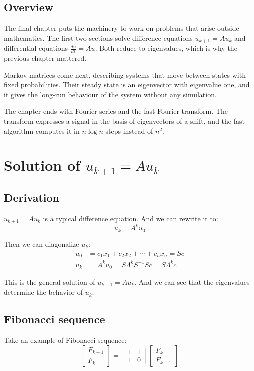 \documentclass[10pt,a4paper,oneside,numbers=noenddot]{scrbook}
\theoremstyle{ctplain}
\theoremstyle{ctresult}
\begin{document}
\subsection*{Overview}

The final chapter puts the machinery to work on problems that arise outside mathematics.
The first two sections solve difference equations $u_{k+1} = A u_k$ and differential
equations $\frac{du}{dt} = A u$. Both reduce to eigenvalues, which is why the previous
chapter mattered.

Markov matrices come next, describing systems that move between states with fixed
probabilities. Their steady state is an eigenvector with eigenvalue one, and it gives the
long-run behaviour of the system without any simulation.

The chapter ends with Fourier series and the fast Fourier transform. The transform
expresses a signal in the basis of eigenvectors of a shift, and the fast algorithm computes
it in $n \log n$ steps instead of $n^2$.


\section{Solution of $u_{k+1} = Au_k$}
\subsection{Derivation}

$u_{k+1} = Au_k$ is a typical difference equation. And we can rewrite it to:
\[
  u_k = A^k u_0
\]

Then we can diagonalize $u_k$:
\begin{align*}
  u_0 &= c_1 x_1 + c_2 x_2 + \cdots + c_n x_n = Sc \\
  u_k &= A^k u_0 = S\Lambda^k S^{-1}Sc = S\Lambda^k c
\end{align*}

This is the general solution of $u_{k+1} = Au_k$. And we can see that the eigenvalues
determine the behavior of $u_k$.

\subsection{Fibonacci sequence}

Take an example of Fibonacci sequence:
\[
  \begin{bmatrix}
    F_{k+1} \\
    F_k
  \end{bmatrix} =
  \begin{bmatrix}
    1 & 1 \\
    1 & 0
  \end{bmatrix}
  \begin{bmatrix}
    F_k \\
    F_{k-1}
  \end{bmatrix}
\]
\end{document}

